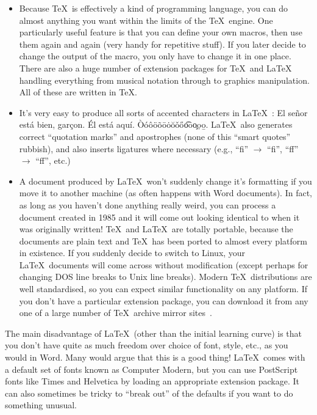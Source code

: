 \documentclass[12pt,a4paper,pdftex]{article}
\begin{document}
\begin{itemize}
	\item Because \TeX\ is effectively a kind of programming language, you can do almost anything you want within the limits of the \TeX\ engine. One particularly useful feature is that you can define your own macros, then use them again and again (very handy for repetitive stuff). If you later decide to change the output of the macro, you only have to change it in one place. There are also a huge number of extension packages for \TeX\ and \LaTeX\, handling everything from musical notation through to graphics manipulation. All of these are written in \TeX.
	
	\item It's very easy to produce all sorts of accented characters in \LaTeX~\cite{UsersGuide}: El se\~{n}or est\'{a} bien, gar\c{c}on. \'{E}l est\'{a} aqu\'{i}. \`{O}\'{o}\^{o}\"{o}\~{o}\={o}\.{o}\u{o}\v{o}\H{o}\t{oo}\c{o}\d{o}\b{o}. \LaTeX\ also generates correct ``quotation marks'' and apostrophes (none of this ``smart quotes'' rubbish), and also inserts ligatures where necessary (e.g., ``f{}i'' \(\rightarrow\) ``fi'', ``f{}f'' \(\rightarrow\) ``ff'', etc.)
	
	\item A document produced by \LaTeX\ won't suddenly change it's formatting if you move it to another machine (as often happens with Word documents). In fact, as long as you haven't done anything really weird, you can process a document created in 1985 and it will come out looking identical to when it was originally written! \TeX\ and \LaTeX\ are totally portable, because the documents are plain text and \TeX\ has been ported to almost every platform in existence. If you suddenly decide to switch to Linux, your \LaTeX\ documents will come across without modification (except perhaps for changing DOS line breaks to Unix line breaks). Modern \TeX\ distributions are well standardised, so you can expect similar functionality on any platform. If you don't have a particular extension package, you can download it from any one of a large number of \TeX\ archive mirror sites~\cite{CTAN}.

\end{itemize}

The main disadvantage of \LaTeX\ (other than the initial learning curve) is that you don't have quite as much freedom over choice of font, style, etc., as you would in Word. Many would argue that this is a good thing! \LaTeX\ comes with a default set of fonts known as Computer Modern, but you can use PostScript fonts like {\selectfont Times} and {\selectfont Helvetica} by loading an appropriate extension package. It can also sometimes be tricky to ``break out'' of the defaults if you want to do something unusual.
\end{document}
